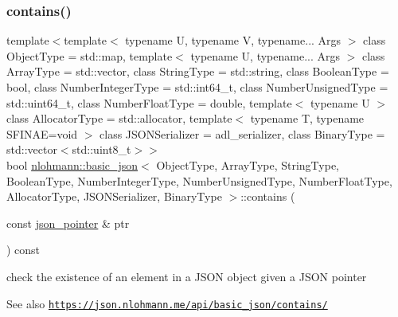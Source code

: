 \subsubsection{\texorpdfstring{contains()}{contains()}\hspace{0.1cm}{\footnotesize\ttfamily [2/2]}}
{\footnotesize\ttfamily template$<$template$<$ typename U, typename V, typename... Args $>$ class Object\+Type = std\+::map, template$<$ typename U, typename... Args $>$ class Array\+Type = std\+::vector, class String\+Type  = std\+::string, class Boolean\+Type  = bool, class Number\+Integer\+Type  = std\+::int64\+\_\+t, class Number\+Unsigned\+Type  = std\+::uint64\+\_\+t, class Number\+Float\+Type  = double, template$<$ typename U $>$ class Allocator\+Type = std\+::allocator, template$<$ typename T, typename S\+F\+I\+N\+A\+E=void $>$ class J\+S\+O\+N\+Serializer = adl\+\_\+serializer, class Binary\+Type  = std\+::vector$<$std\+::uint8\+\_\+t$>$$>$ \\
bool \hyperlink{classnlohmann_1_1basic__json}{nlohmann\+::basic\+\_\+json}$<$ Object\+Type, Array\+Type, String\+Type, Boolean\+Type, Number\+Integer\+Type, Number\+Unsigned\+Type, Number\+Float\+Type, Allocator\+Type, J\+S\+O\+N\+Serializer, Binary\+Type $>$\+::contains (\begin{DoxyParamCaption}\item[{const \hyperlink{classnlohmann_1_1basic__json_aa8f1f93b32da01b42413643be32b2c27}{json\+\_\+pointer} \&}]{ptr }\end{DoxyParamCaption}) const\hspace{0.3cm}{\ttfamily [inline]}}



check the existence of an element in a J\+S\+ON object given a J\+S\+ON pointer 

\begin{DoxySeeAlso}{See also}
\href{https://json.nlohmann.me/api/basic_json/contains/}{\tt https\+://json.\+nlohmann.\+me/api/basic\+\_\+json/contains/} 
\end{DoxySeeAlso}
\mbox{\label{classnlohmann_1_1basic__json_aba5ec6d1e37eda6b11eba491a1e5237e}} 
